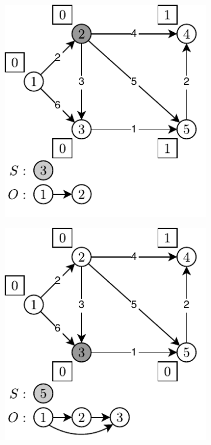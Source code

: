 \begin{figure}[!htbp]
\begin{subfigure}[b]{0.25\textwidth}
		\caption{}
	\end{subfigure}
	\qquad
	\begin{subfigure}[b]{0.25\textwidth}
		\includegraphics[width=\textwidth]{Chapter_II/KHAN-TOPOLOGICAL-SORT-Example/c.pdf}
		\caption{}
	\end{subfigure}
	\begin{subfigure}[b]{0.25\textwidth}
		\includegraphics[width=\textwidth]{Chapter_II/KHAN-TOPOLOGICAL-SORT-Example/d.pdf}

\end{subfigure}
\end{figure}
